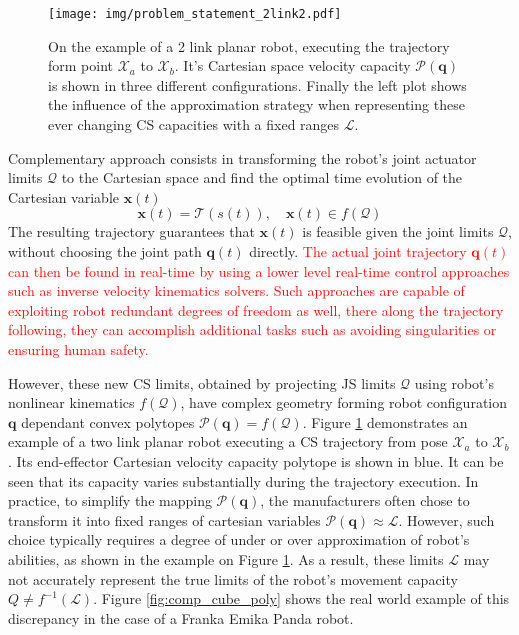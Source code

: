 \begin{figure}[!t]
    \centering 
    \texttt{[image: img/problem\_statement\_2link2.pdf]}
    \caption{On the example of a 2 link planar robot, executing the trajectory form point $\mathcal{X}_a$ to $\mathcal{X}_b$. It's Cartesian space velocity capacity $\mathcal{P}(\bm{q})$ is shown in three different configurations. Finally the left plot shows the influence of the approximation strategy when representing these ever changing CS capacities with a fixed ranges $\mathcal{L}$. }
    \label{fig:2link}
\end{figure}


Complementary approach consists in transforming the robot's joint actuator limits $\mathcal{Q}$ to the Cartesian space and find the optimal time evolution of the Cartesian variable $\bm{x}(t)$
\begin{equation}
\bm{x}(t) = \mathcal{T}(s(t)) , \quad \bm{x}(t) \in f(\mathcal{Q})
\end{equation}
The resulting trajectory guarantees that $\bm{x}(t)$ is feasible given the joint limits $\mathcal{Q}$, without choosing the joint path $\bm{q}(t)$ directly. \textcolor{red}{The actual joint trajectory $\bm{q}(t)$ can then be found in real-time by using a lower level real-time control approaches such as inverse velocity kinematics solvers. Such approaches are capable of exploiting robot redundant degrees of freedom as well, there along the trajectory following, they can accomplish additional tasks such as avoiding singularities \cite{Cheng1995} or ensuring human safety\cite{joseph2020}. }

However, these new CS limits, obtained by projecting JS limits $\mathcal{Q}$ using robot's nonlinear kinematics $f(\mathcal{Q})$, have complex geometry forming robot configuration $\bm{q}$ dependant convex polytopes $\mathcal{P}(\bm{q}) = f(\mathcal{Q})$. Figure \ref{fig:2link} demonstrates an example of a two link planar robot executing a CS trajectory from pose $\mathcal{X}_a$ to $\mathcal{X}_b$. Its end-effector Cartesian velocity capacity polytope is shown in blue. It can be seen that its capacity varies substantially during the trajectory execution. In practice, to simplify the mapping $\mathcal{P}(\bm{q})$, the manufacturers often chose to transform it into fixed ranges of cartesian variables $\mathcal{P}(\bm{q}) \approx \mathcal{L}$. However, such choice typically requires a degree of under or over approximation of robot's abilities, as shown in the example on Figure \ref{fig:2link}. As a result, these limits $\mathcal{L}$ may not accurately represent the true limits of the robot's movement capacity $Q \neq f^{-1}(\mathcal{L})$. Figure \ref{fig:comp_cube_poly} shows the real world example of this discrepancy in the case of a Franka Emika Panda robot. 

